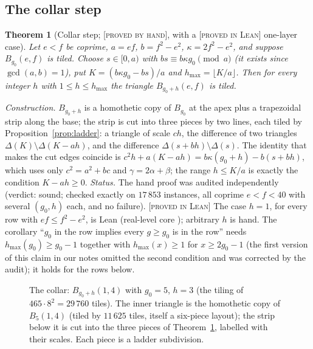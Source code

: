 \documentclass[11pt,reqno]{amsart}
\theoremstyle{plain}
\newtheorem{theorem}{Theorem}[section]
\theoremstyle{definition}
\newcommand{\lab}[1]{\textup{[\textsc{#1}]}}
\newcommand{\PL}{\lab{proved in Lean}}
\newcommand{\PH}{\lab{proved by hand}}
\newcommand{\FIGSLOT}[1]{\begin{center}\fbox{\parbox{0.88\linewidth}{\centering\vspace{3.5em}\textsf{[figure slot: #1]}\vspace{3.5em}}}\end{center}}
\begin{document}
\subsection{The collar step}
\begin{theorem}[Collar step; \PH{}, with a \PL{} one-layer case]\label{thm:collar}
Let $e<f$ be coprime, $a=ef$, $b=f^2-e^2$, $\kappa=2f^2-e^2$, and suppose $B_{g_0}(e,f)$ is tiled. Choose $s\in[0,a)$ with $bs\equiv b\kappa g_0\pmod a$ (it exists since $\gcd(a,b)=1$), put $K=(b\kappa g_0-bs)/a$ and $h_{\max}=\lfloor K/a\rfloor$.
Then for every integer $h$ with $1\le h\le h_{\max}$ the triangle $B_{g_0+h}(e,f)$ is tiled.
\end{theorem}
\emph{Construction.} $B_{g_0+h}$ is a homothetic copy of $B_{g_0}$ at the apex plus a trapezoidal strip along the base; the strip is cut into three pieces by two lines, each tiled by Proposition~\ref{prop:ladder}: a triangle of scale $ch$, the difference of two triangles $\Delta(K)\setminus\Delta(K-ah)$, and the difference $\Delta(s+bh)\setminus\Delta(s)$.
The identity that makes the cut edges coincide is $c^2h+a(K-ah)=b\kappa(g_0+h)-b(s+bh)$, which uses only $c^2=a^2+bc$ and $\gamma=2\alpha+\beta$; the range $h\le K/a$ is exactly the condition $K-ah\ge0$.
\emph{Status.} The hand proof was audited independently (verdict: sound; checked exactly on $17\,853$ instances, all coprime $e<f<40$ with several $(g_0,h)$ each, and no failure). \PL{} The case $h=1$, for every row with $ef\le f^2-e^2$, is Lean  (real-level core ); arbitrary $h$ is hand.
The corollary ``$g_0$ in the row implies every $g\ge g_0$ is in the row'' needs $h_{\max}(g_0)\ge g_0-1$ together with $h_{\max}(x)\ge1$ for $x\ge2g_0-1$ (the first version of this claim in our notes omitted the second condition and was corrected by the audit); it holds for the rows below.

\begin{figure}[ht]
\FIGSLOT{collar}
\caption{The collar: $B_{g_0+h}(1,4)$ with $g_0=5$, $h=3$ (the tiling of $465\cdot8^2=29\,760$ tiles). The inner triangle is the homothetic copy of $B_{5}(1,4)$ (tiled by $11\,625$ tiles, itself a six-piece layout); the strip below it is cut into the three pieces of Theorem~\ref{thm:collar}, labelled with their scales. Each piece is a ladder subdivision.}
\end{figure}
\end{document}
